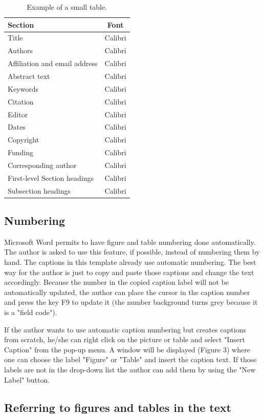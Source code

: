 \documentclass[10pt]{style_src/imeko_acta}
\begin{document}
\begin{table}[!b]
	\caption{Example of a small table.}
	\label{tab:tab2}
	\centering
\begin{tabular}{lc}
	\toprule
	Section & Font \\
	\midrule
	Title & Calibri \\
	Authors & Calibri \\
	Affiliation and email address & Calibri \\
	Abstract text & Calibri \\
	Keywords & Calibri \\
	Citation & Calibri \\
	Editor & Calibri \\
	Dates & Calibri \\
	Copyright & Calibri \\
	Funding & Calibri \\
	Corresponding author & Calibri \\
	First-level Section headings  & Calibri \\
	Subsection headings & Calibri \\
	\bottomrule
\end{tabular}
\end{table}

\subsection{Numbering}

Microsoft Word permits to have figure and table numbering done automatically. The author is asked to use this feature, if possible, instead of numbering them by hand. The captions in this template already use automatic numbering. The best way for the author is just to copy and paste those captions and change the text accordingly. Because the number in the copied caption label will not be automatically updated, the author can place the cursor in the caption number and press the key F9 to update it (the number background turns grey because it is a "field code").

If the author wants to use automatic caption numbering but creates captions from scratch, he/she can right click on the picture or table and select "Insert Caption" from the pop-up menu. A window will be displayed (Figure 3) where one can choose the label "Figure" or "Table" and insert the caption text. If those labels are not in the drop-down list the author can add them by using the "New Label" button.


\subsection{Referring to figures and tables in the text}\label{sec:reffig}
\end{document}
